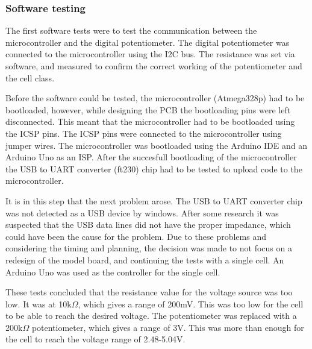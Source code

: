 \subsubsection{Software testing}
The first software tests were to test the communication between the microcontroller and the digital potentiometer. The digital potentiometer was connected to the microcontroller using the I2C bus. The resistance was set via software, and measured to confirm the correct working of the potentiometer and the cell class.

Before the software could be tested, the microcontroller (Atmega328p) had to be bootloaded, however, while designing the PCB the bootloading pins were left disconnected. This meant that the microcontroller had to be bootloaded using the ICSP pins. The ICSP pins were connected to the microcontroller using jumper wires. The microcontroller was bootloaded using the Arduino IDE and an Arduino Uno as an ISP. After the succesfull bootloading of the microcontroller the USB to UART converter (ft230) chip had to be tested to upload code to the microcontroller. 

It is in this step that the next problem arose. The USB to UART converter chip was not detected as a USB device by windows. After some research it was suspected that the USB data lines did not have the proper impedance, which could have been the cause for the problem. Due to these problems and considering the timing and planning, the decision was made to not focus on a redesign of the model board, and continuing the tests with a single cell. An Arduino Uno was used as the controller for the single cell.

These tests concluded that the resistance value for the voltage source was too low. It was at 10k$\Omega$, which gives a range of 200mV. This was too low for the cell to be able to reach the desired voltage. The potentiometer was replaced with a 200k$\Omega$ potentiometer, which gives a range of 3V. This was more than enough for the cell to reach the voltage range of 2.48-5.04V.